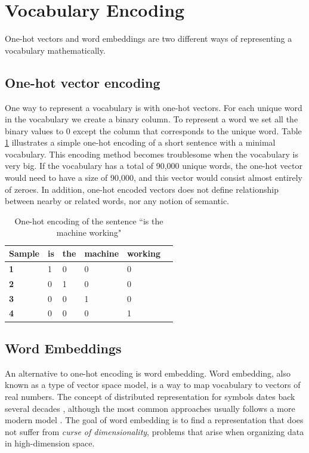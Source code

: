 
\section{Vocabulary Encoding}
One-hot vectors and word embeddings are two different ways of representing a vocabulary mathematically. 

\subsection{One-hot vector encoding}
One way to represent a vocabulary is with one-hot vectors. For each unique word in the vocabulary we create a binary column. To represent a word we set all the binary values to \(0\) except the column that corresponds to the unique word. Table  \ref{table:one_hot_encoding} illustrates a simple one-hot encoding of a short sentence with a minimal vocabulary. This encoding method becomes troublesome when the vocabulary is very big. If the vocabulary has a total of 90,000 unique words, the one-hot vector would need to have a size of 90,000, and this vector would consist almost entirely of zeroes. In addition, one-hot encoded vectors does not define relationship between nearby or related words, nor any notion of semantic.

\begin{table}[H]
    \centering
    \begin{tabular}{|l|l|l|l|l|l|}
        \hline
        \textbf{Sample} & \textbf{is} & \textbf{the} & \textbf{machine} & \textbf{working} \\ \hline
        \textbf{1}      & 1           & 0            & 0                & 0                \\ \hline
        \textbf{2}      & 0           & 1            & 0                & 0                \\ \hline
        \textbf{3}      & 0           & 0            & 1                & 0                \\ \hline
        \textbf{4}      & 0           & 0            & 0                & 1                \\ \hline
    \end{tabular}
    \caption{One-hot encoding of the sentence ``is the machine working"}
    \label{table:one_hot_encoding}
\end{table}

\subsection{Word Embeddings}
An alternative to one-hot encoding is word embedding. Word embedding, also known as a type of vector space model, is a way to map vocabulary to vectors of real numbers. The concept of distributed representation for symbols dates back several decades \citep{hinton1986learning}, although the most common approaches usually follows a more modern model \citep{bengio2003neural}. The goal of word embedding is to find a representation that does not suffer from \emph{curse of dimensionality}, problems that arise when organizing data in high-dimension space. 


